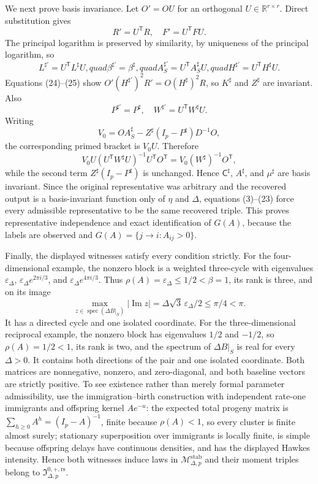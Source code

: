 We next prove basis invariance.  Let \(O'=OU\) for an orthogonal \(U\in\mathbb R^{r\times r}\).  Direct substitution gives
\[
 R'=U^{\mathsf T}R,\quad F'=U^{\mathsf T}FU.
\tag{24}
\]
The principal logarithm is preserved by similarity, by uniqueness of the principal logarithm, so
\[
 L^{\sharp\prime}=U^{\mathsf T}L^\sharp U,quad
 \beta^{\sharp\prime}=\beta^\sharp,quad
 A_S^{\sharp\prime}=U^{\mathsf T}A_S^\sharp U,quad
 H^{\sharp\prime}=U^{\mathsf T}H^\sharp U.
\tag{25}
\]
Equations (24)--(25) show \(O'(H^{\sharp\prime})^2R'=O(H^\sharp)^2R\), so \(K^\sharp\) and \(Z^\sharp\) are invariant.  Also
\[
 P^{\sharp\prime}=P^\sharp,\quad
 W^{\sharp\prime}=U^{\mathsf T}W^\sharp U.
\tag{26}
\]
Writing
\[
 V_0=OA_S^\sharp-Z^\sharp(I_p-P^\sharp)D^{-1}O,
\]
the corresponding primed bracket is \(V_0U\).  Therefore
\[
 V_0U(U^{\mathsf T}W^\sharp U)^{-1}U^{\mathsf T}O^{\mathsf T}
 =V_0(W^\sharp)^{-1}O^{\mathsf T},
\]
while the second term \(Z^\sharp(I_p-P^\sharp)\) is unchanged.  Hence \(\mathsf C^\sharp\), \(A^\sharp\), and \(\mu^\sharp\) are basis invariant.  Since the original representative was arbitrary and the recovered output is a basis-invariant function only of \(\eta\) and \(\Delta\), equations (3)--(23) force every admissible representative to be the same recovered triple.  This proves representative independence and exact identification of \(G(A)\), because the labels are observed and \(G(A)=\{j\to i:A_{ij}>0\}\).

Finally, the displayed witnesses satisfy every condition strictly.  For the four-dimensional example, the nonzero block is a weighted three-cycle with eigenvalues \(\varepsilon_\Delta\), \(\varepsilon_\Delta e^{2\pi i/3}\), and \(\varepsilon_\Delta e^{4\pi i/3}\).  Thus \(\rho(A)=\varepsilon_\Delta\leq1/2<\beta=1\), its rank is three, and on its image
\[
 \max_{z\in\operatorname{spec}(\Delta B|_S)}|\operatorname{Im}z|
 =\Delta\sqrt3\,\varepsilon_\Delta/2\leq\pi/4<\pi.
\]
It has a directed cycle and one isolated coordinate.  For the three-dimensional reciprocal example, the nonzero block has eigenvalues \(1/2\) and \(-1/2\), so \(\rho(A)=1/2<1\), its rank is two, and the spectrum of \(\Delta B|_S\) is real for every \(\Delta>0\).  It contains both directions of the pair and one isolated coordinate.  Both matrices are nonnegative, nonzero, and zero-diagonal, and both baseline vectors are strictly positive.  To see existence rather than merely formal parameter admissibility, use the immigration--birth construction with independent rate-one immigrants and offspring kernel \(Ae^{-u}\): the expected total progeny matrix is \(\sum_{h\geq0}A^h=(I_p-A)^{-1}\), finite because \(\rho(A)<1\), so every cluster is finite almost surely; stationary superposition over immigrants is locally finite, is simple because offspring delays have continuous densities, and has the displayed Hawkes intensity.  Hence both witnesses induce laws in \(\mathcal M_{\Delta,p}^{\mathrm{stab}}\) and their moment triples belong to \(\mathfrak I_{\Delta,p}^{0,+,\mathrm{rs}}\).